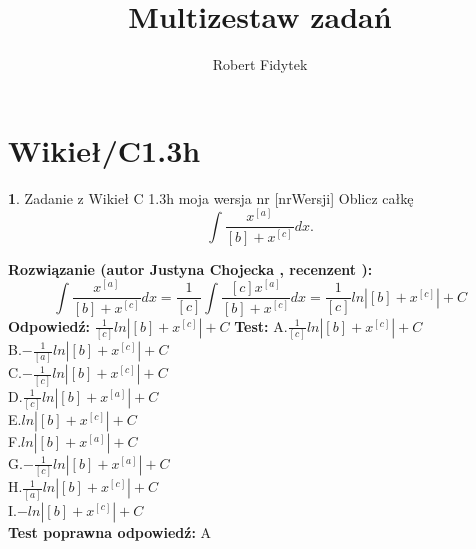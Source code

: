 \documentclass[12pt, a4paper]{article}
\title{Multizestaw zadań}
\author{Robert Fidytek}
\date{}
\theoremstyle{definition} %
\newtheorem{zad}{}
\newcommand{\kategoria}[1]{\section{#1}} %
\newcommand{\zadStart}[1]{\begin{zad}#1\newline} %
\newcommand{\zadStop}{\end{zad}}   %
\newcommand{\rozwStart}[2]{\noindent \textbf{Rozwiązanie (autor #1 , recenzent #2): }\newline} %
\newcommand{\rozwStop}{\newline}                                            %
\newcommand{\odpStart}{\noindent \textbf{Odpowiedź:}\newline}    %
\newcommand{\odpStop}{\newline}                                             %
\newcommand{\testStart}{\noindent \textbf{Test:}\newline} %
\newcommand{\testStop}{\newline} %
\newcommand{\kluczStart}{\noindent \textbf{Test poprawna odpowiedź:}\newline} %
\newcommand{\kluczStop}{\newline} %
\begin{document}
\maketitle
\kategoria{Wikieł/C1.3h}
\zadStart{Zadanie z Wikieł C 1.3h moja wersja nr [nrWersji]}
Oblicz całkę $$\int \frac{x^{[a]}}{[b]+x^{[c]}} dx.$$
\zadStop
\rozwStart{Justyna Chojecka}{}
$$\int \frac{x^{[a]}}{[b]+x^{[c]}} dx=\frac{1}{[c]}\int\frac{[c]x^{[a]}}{[b]+x^{[c]}}dx=\frac{1}{[c]}ln \left|[b]+x^{[c]}\right|+C$$
\rozwStop
\odpStart
$\frac{1}{[c]}ln \left|[b]+x^{[c]}\right|+C$
\odpStop
\testStart
A.$\frac{1}{[c]}ln \left|[b]+x^{[c]}\right|+C$\\
B.$-\frac{1}{[a]}ln \left|[b]+x^{[c]}\right|+C$\\
C.$-\frac{1}{[c]}ln \left|[b]+x^{[c]}\right|+C$\\
D.$\frac{1}{[c]}ln \left|[b]+x^{[a]}\right|+C$\\
E.$ln \left|[b]+x^{[c]}\right|+C$\\
F.$ln \left|[b]+x^{[a]}\right|+C$\\
G.$-\frac{1}{[c]}ln \left|[b]+x^{[a]}\right|+C$\\
H.$\frac{1}{[a]}ln \left|[b]+x^{[c]}\right|+C$\\
I.$-ln \left|[b]+x^{[c]}\right|+C$\\
\testStop
\kluczStart
A
\kluczStop
\end{document}
